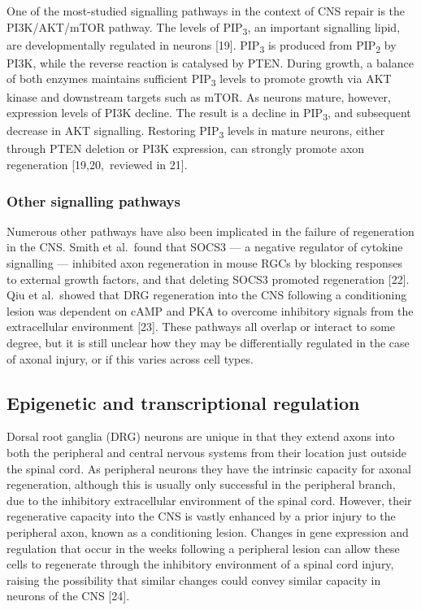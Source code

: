 \documentclass[
  12pt,
  a4paper,
]{book}
\begin{document}
One of the most-studied signalling pathways in the context of CNS repair is the PI3K/AKT/mTOR pathway. The levels of PIP\textsubscript{3}, an important signalling lipid, are developmentally regulated in neurons {[}19{]}. PIP\textsubscript{3} is produced from PIP\textsubscript{2} by PI3K, while the reverse reaction is catalysed by PTEN. During growth, a balance of both enzymes maintains sufficient PIP\textsubscript{3} levels to promote growth via AKT kinase and downstream targets such as mTOR. As neurons mature, however, expression levels of PI3K decline. The result is a decline in PIP\textsubscript{3}, and subsequent decrease in AKT signalling. Restoring PIP\textsubscript{3} levels in mature neurons, either through PTEN deletion or PI3K expression, can strongly promote axon regeneration {[}19,20,~reviewed in 21{]}.

\hypertarget{other-signalling-pathways}{%
\subsubsection{Other signalling pathways}\label{other-signalling-pathways}}

Numerous other pathways have also been implicated in the failure of regeneration in the CNS. Smith et al.~found that SOCS3 --- a negative regulator of cytokine signalling --- inhibited axon regeneration in mouse RGCs by blocking responses to external growth factors, and that deleting SOCS3 promoted regeneration {[}22{]}. Qiu et al.~showed that DRG regeneration into the CNS following a conditioning lesion was dependent on cAMP and PKA to overcome inhibitory signals from the extracellular environment {[}23{]}. These pathways all overlap or interact to some degree, but it is still unclear how they may be differentially regulated in the case of axonal injury, or if this varies across cell types.

\hypertarget{epigenetic-and-transcriptional-regulation}{%
\subsection{Epigenetic and transcriptional regulation}\label{epigenetic-and-transcriptional-regulation}}

Dorsal root ganglia (DRG) neurons are unique in that they extend axons into both the peripheral and central nervous systems from their location just outside the spinal cord. As peripheral neurons they have the intrinsic capacity for axonal regeneration, although this is usually only successful in the peripheral branch, due to the inhibitory extracellular environment of the spinal cord. However, their regenerative capacity into the CNS is vastly enhanced by a prior injury to the peripheral axon, known as a conditioning lesion. Changes in gene expression and regulation that occur in the weeks following a peripheral lesion can allow these cells to regenerate through the inhibitory environment of a spinal cord injury, raising the possibility that similar changes could convey similar capacity in neurons of the CNS {[}24{]}.
\end{document}
